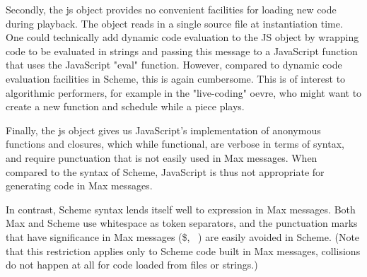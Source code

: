 \documentclass[acmsmall]{acmart}
\begin{document}
Secondly, the js object provides no convenient facilities for loading new code
during playback. The object reads in a single source file at instantiation time.
One could technically add dynamic code evaluation to the JS object by wrapping
code to be evaluated in strings and passing this message to a JavaScript function
that uses the JavaScript "eval" function. However, compared to dynamic code
evaluation facilities in Scheme, this is again cumbersome. This is of interest
to algorithmic performers, for example in the "live-coding" oevre, who might
want to create a new function and schedule while a piece plays.

Finally, the js object gives us JavaScript's implementation of anonymous functions
and closures, which while functional, are verbose in terms of syntax, and require
punctuation that is not easily used in Max messages. When compared to the syntax
of Scheme, JavaScript is thus not appropriate for generating code in Max messages.

In contrast, Scheme syntax lends itself well to expression in Max messages. 
Both Max and Scheme use whitespace as token separators, and the punctuation marks
that have significance in Max messages (\$, \, \;) are easily avoided in Scheme.
(Note that this restriction applies only to Scheme code built in Max messages, collisions
do not happen at all for code loaded from files or strings.)
\end{document}
